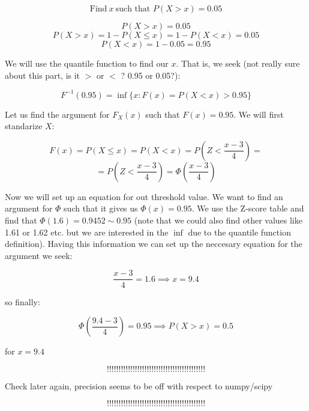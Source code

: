 \documentclass{article}
\begin{document}
\begin{equation*}
    \mbox{Find}  \ x  \ \mbox{such that } P(X > x) = 0.05
\end{equation*}

\begin{equation*}
    P(X > x) = 0.05
\end{equation*}
\begin{equation*}
    P(X > x) = 1 - P(X \leq x) = 1 - P(X < x) = 0.05
\end{equation*}
\begin{equation*}
    P(X < x) = 1 - 0.05 = 0.95
\end{equation*}

We will use the quantile function to find our \(x\). That is, we seek 
(not really sure about this part, is it \(>\) or \(<\) ? 0.95 or 0.05?):

\begin{equation*}
    F^{-1}(0.95) = \inf \{x : F(x) = P(X < x) > 0.95\}
\end{equation*}

Let us find the argument for \(F_{X}(x)\) such that \(F(x) = 0.95\). We will first standarize \(X\):

\begin{equation*}
    F(x) = P(X \leq x) =  P(X < x) = P(Z < \frac{x - 3}{4}) =
\end{equation*}
\begin{equation*}
    = P(Z < \frac{x - 3}{4}) =  \Phi(\frac{x - 3}{4})
\end{equation*}

Now we will set up an equation for out threshold value. We want to find an argument for \(\Phi\) such that it gives us
\(\Phi(x) = 0.95\). We use the Z-score table and find that \(\Phi(1.6) = 0.9452 \sim 0.95\) (note that we could also find other values
like 1.61 or 1.62 etc. but we are interested in the \(\inf\) due to the quantile function definition). Having this information
we can set up the neccesary equation for the argument we seek:

\begin{equation*}
    \frac{x - 3}{4} = 1.6 \implies x = 9.4
\end{equation*}

so finally:

\begin{equation*}
    \Phi(\frac{9.4 - 3}{4}) = 0.95 \implies P(X > x) = 0.5
\end{equation*}

for \(x = 9.4\)

\begin{equation*}
    !!!!!!!!!!!!!!!!!!!!!!!!!!!!!!!!!!!!!!!!!!
\end{equation*}
\begin{center}
    Check later again, precision seems to be off with respect to numpy/scipy
\end{center}
\begin{equation*}
    !!!!!!!!!!!!!!!!!!!!!!!!!!!!!!!!!!!!!!!!!!
\end{equation*}
\end{document}
